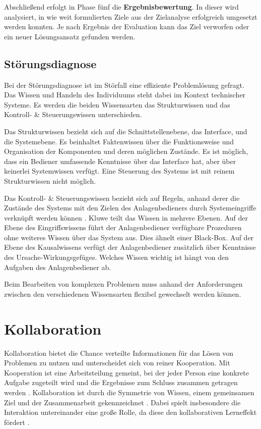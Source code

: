 Abschließend erfolgt in Phase fünf die \textbf{Ergebnisbewertung}. In dieser wird analysiert, in wie weit formulierten Ziele aus der Zielanalyse erfolgreich umgesetzt werden konnten. Je nach Ergebnis der Evaluation kann das Ziel verworfen oder ein neuer Lösungsansatz gefunden werden.
\cite{Betsch2011}

\subsection{Störungsdiagnose}
\label{2-Störungsdiagnose}
Bei der Störungsdiagnose ist im Störfall eine effiziente Problemlösung gefragt. Das Wissen und Handeln des Individuums steht dabei im Kontext technischer Systeme. Es werden die beiden Wissensarten das Strukturwissen und das Kontroll- \& Steuerungswissen unterschieden. \cite{Funke2015}

Das Strukturwissen bezieht sich auf die Schnittstellenebene, das Interface, und die Systemebene. Es beinhaltet Faktenwissen über die Funktionsweise und Organisation der Komponenten und deren möglichen Zustände. Es ist möglich, dass ein Bediener umfassende Kenntnisse über das Interface hat, aber über keinerlei Systemwissen verfügt. Eine Steuerung des Systems ist mit reinem Strukturwissen nicht möglich. \cite{Funke2015, Kluwe1997}

Das Kontroll- \& Steuerungswissen bezieht sich auf Regeln, anhand derer die Zustände des Systems mit den Zielen des Anlagenbedieners durch Systemeingriffe verknüpft werden können \cite{Funke2015}. Kluwe \cite{Kluwe1997} teilt das Wissen in mehrere Ebenen. Auf der Ebene des Eingriffswissens führt der Anlagenbediener verfügbare Prozeduren ohne weiteres Wissen über das System aus. Dies ähnelt einer Black-Box. Auf der Ebene des Kausalwissens verfügt der Anlagenbediener zusätzlich über Kenntnisse des Ursache-Wirkungsgefüges. Welches Wissen wichtig ist hängt von den Aufgaben des Anlagenbediener ab.

Beim Bearbeiten von komplexen Problemen muss anhand der Anforderungen zwischen den verschiedenen Wissensarten flexibel gewechselt werden können. \cite{Funke2015}

\section{Kollaboration}
Kollaboration bietet die Chance verteilte Informationen für das Lösen von Problemen zu nutzen und unterscheidet sich von reiner Kooperation. Mit Kooperation ist eine Arbeitsteilung gemeint, bei der jeder Person eine konkrete Aufgabe zugeteilt wird und die Ergebnisse zum Schluss zusammen getragen werden \cite{Jermann2004}. Kollaboration ist durch die Symmetrie von Wissen, einem gemeinsamen Ziel und der Zusammenarbeit gekennzeichnet \cite{Rummel1958}. Dabei spielt insbesondere die Interaktion untereinander eine große Rolle, da diese den kollaborativen Lerneffekt fördert \cite{Jermann2004}.

